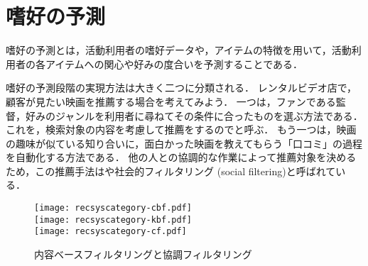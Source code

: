 \chapter{嗜好の予測}
\label{chap:process}

嗜好の予測とは，活動利用者の嗜好データや，アイテムの特徴を用いて，活動利用者の各アイテムへの関心や好みの度合いを予測することである．

嗜好の予測段階の実現方法は大きく二つに分類される．
レンタルビデオ店で，顧客が見たい映画を推薦する場合を考えてみよう．
一つは，ファンである監督，好みのジャンルを利用者に尋ねてその条件に合ったものを選ぶ方法である．
これを，検索対象の内容を考慮して推薦をするのでと呼ぶ．
もう一つは，映画の趣味が似ている知り合いに，面白かった映画を教えてもらう「口コミ」の過程を自動化する方法である．
他の人との協調的な作業によって推薦対象を決めるため，この推薦手法はや社会的フィルタリング (social filtering)と呼ばれている．

\begin{figure}
\centering
{}%
{\texttt{[image: recsyscategory-cbf.pdf]}}\\\medskip
{}%
{\texttt{[image: recsyscategory-kbf.pdf]}}\\\medskip
{}%
{\texttt{[image: recsyscategory-cf.pdf]}}
\caption{内容ベースフィルタリングと協調フィルタリング}
\label{fig:cfcbf}
\end{figure}

